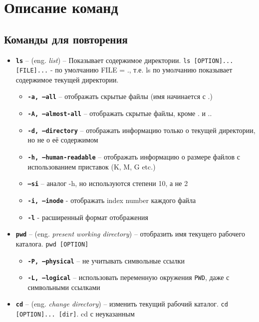 \documentclass[12pt, a4paper]{article}
\begin{document}

\section{Описание команд}
\subsection{Команды для повторения}
\begin{itemize}
  \item \textbf{\texttt{ls}} -- (eng. \textit{list}) -- Показывает содержимое
    директории. \texttt{ls [OPTION]... [FILE]...} - по умолчанию FILE = ., т.е.
    ls по умолчанию показывает содержимое текущей директории.
    \begin{itemize}
      \item \textbf{\texttt{-a, --all}} -- отображать скрытые файлы (имя
        начинается с .)
      \item \textbf{\texttt{-A, --almost-all}} -- отображать скрытые файлы,
        кроме . и ..
      \item \textbf{\texttt{-d, --directory}} -- отображать информацию только
        о текущей директории, но не о её содержимом
      \item \textbf{\texttt{-h, --human-readable}} -- отображать информацию о
        размере файлов с использованием приставок (K, M, G etc.)
      \item \textbf{\texttt{--si}} -- аналог -h, но используются степени 10, а
        не 2
      \item \textbf{\texttt{-i, --inode}} - отображать index number каждого файла
      \item \textbf{\texttt{-l}} - расширенный формат отображения
    \end{itemize}
  \item \textbf{\texttt{pwd}} -- (eng. \textit{present working directory}) --
    отобразить имя текущего рабочего каталога. \texttt{pwd [OPTION]}
    \begin{itemize}
      \item \textbf{\texttt{-P, --physical}} -- не учитывать символьные ссылки
      \item \textbf{\texttt{-L, --logical}} -- использовать переменную окружения
        \texttt{PWD}, даже с символьными ссылками
    \end{itemize}
  \item \textbf{\texttt{cd}} -- (eng. \textit{change directory}) -- изменить
    текущий рабочий каталог. \texttt{cd [OPTION]... [dir]}. cd с неуказанным

\end{itemize}
\end{document}
